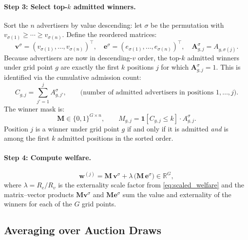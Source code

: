 \documentclass[11pt]{article}
\begin{document}
\paragraph{Step 3: Select top-$k$ admitted winners.}
Sort the $n$ advertisers by value descending:
let $\sigma$ be the permutation with $v_{\sigma(1)} \geq \cdots \geq v_{\sigma(n)}$.
Define the reordered matrices:
\begin{equation}
    \mathbf{v}^{\sigma} = (v_{\sigma(1)},\ldots,v_{\sigma(n)})^{\!\top},\quad
    \mathbf{e}^{\sigma} = (e_{\sigma(1)},\ldots,e_{\sigma(n)})^{\!\top},\quad
    \mathbf{A}^{\sigma}_{g,j} = A_{g,\sigma(j)}.
\end{equation}
Because advertisers are now in descending-$v$ order, the top-$k$ admitted
winners under grid point $g$ are exactly the first $k$ positions $j$ for
which $\mathbf{A}^{\sigma}_{g,j} = 1$.
This is identified via the cumulative admission count:
\begin{equation}
    C_{g,j} = \sum_{j'=1}^{j} A^{\sigma}_{g,j'}, \qquad
    \text{(number of admitted advertisers in positions } 1, \ldots, j\text{)}.
\end{equation}
The winner mask is:
\begin{equation}
    \mathbf{M} \in \{0,1\}^{G \times n}, \qquad
    M_{g,j} = \mathbf{1}[C_{g,j} \leq k]\cdot A^{\sigma}_{g,j}.
    \label{eq:winner_mask}
\end{equation}
Position $j$ is a winner under grid point $g$ if and only if it is admitted
\emph{and} is among the first $k$ admitted positions in the sorted order.

\paragraph{Step 4: Compute welfare.}
\begin{equation}
    \mathbf{w}^{(j)} = \mathbf{M}\,\mathbf{v}^{\sigma}
                     + \lambda\,\bigl(\mathbf{M}\,\mathbf{e}^{\sigma}\bigr)
                     \in \mathbb{R}^{G},
    \label{eq:auction_welfare}
\end{equation}
where $\lambda = R_e / R_v$ is the externality scale factor from
\eqref{eq:scaled_welfare} and the matrix--vector products
$\mathbf{M}\mathbf{v}^{\sigma}$ and $\mathbf{M}\mathbf{e}^{\sigma}$
sum the value and externality of the winners for each of the $G$ grid points.

\subsection{Averaging over Auction Draws}
\end{document}
